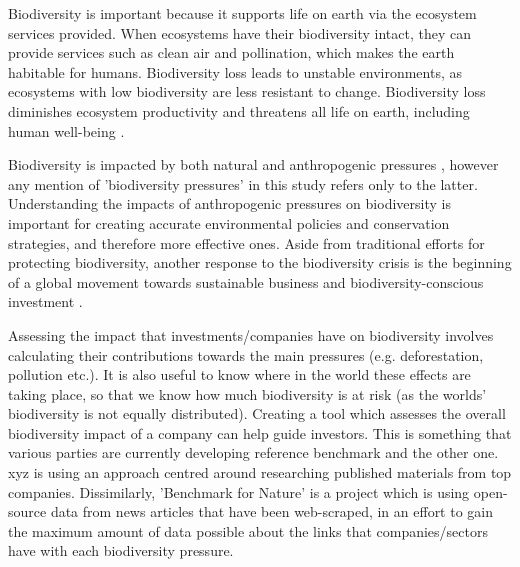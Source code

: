 \documentclass[11pt, a4paper, titlepage]{article}
\begin{document}
   	 Biodiversity is important because it supports life on earth via the ecosystem services provided. When ecosystems have their biodiversity intact, they can provide services such as clean air and pollination, which makes the earth habitable for humans. Biodiversity loss leads to unstable environments, as ecosystems with low biodiversity are less resistant to change. Biodiversity loss diminishes ecosystem productivity \cite{duffy2017biodiversity} and threatens all life on earth, including human well-being \cite{diaz2006biodiversity}. \newline
   	 
   	 Biodiversity is impacted by both natural and anthropogenic pressures \cite{nobel2020anthropogenic}, however any mention of 'biodiversity pressures' in this study refers only to the latter. Understanding the impacts of anthropogenic pressures on biodiversity is important for creating accurate environmental policies and conservation strategies, and therefore more effective ones. Aside from traditional efforts for protecting biodiversity, another response to the biodiversity crisis \cite{ogar2020science} is the beginning of a global movement towards sustainable business and biodiversity-conscious investment \cite{pri2020}\cite{worldeconomicforum2020}\cite{wwf2020}. \newline
   	 
   	 Assessing the impact that investments/companies have on biodiversity involves calculating their contributions towards the main pressures (e.g. deforestation, pollution etc.). It is also useful to know where in the world these effects are taking place, so that we know how much biodiversity is at risk (as the worlds' biodiversity is not equally distributed). Creating a tool which assesses the overall biodiversity impact of a company can help guide investors. This is something that various parties are currently developing {reference benchmark and the other one}. xyz is using an approach centred around researching published materials from top companies. Dissimilarly, 'Benchmark for Nature' is a project which is using open-source data from news articles that have been web-scraped, in an effort to gain the maximum amount of data possible about the links that companies/sectors have with each biodiversity pressure.  \newline
   	 
\end{document}
